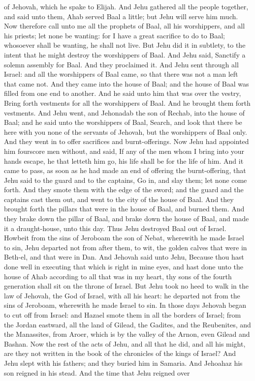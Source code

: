of Jehovah, which he spake to Elijah.  And Jehu gathered all the people together, and said unto them, Ahab served Baal a little; but Jehu will serve him much. Now therefore call unto me all the prophets of Baal, all his worshippers, and all his priests; let none be wanting: for I have a great sacrifice to do to Baal; whosoever shall be wanting, he shall not live. But Jehu did it in subtlety, to the intent that he might destroy the worshippers of Baal. And Jehu said, Sanctify a solemn assembly for Baal. And they proclaimed it. And Jehu sent through all Israel: and all the worshippers of Baal came, so that there was not a man left that came not. And they came into the house of Baal; and the house of Baal was filled from one end to another. And he said unto him that was over the vestry, Bring forth vestments for all the worshippers of Baal. And he brought them forth vestments. And Jehu went, and Jehonadab the son of Rechab, into the house of Baal; and he said unto the worshippers of Baal, Search, and look that there be here with you none of the servants of Jehovah, but the worshippers of Baal only. And they went in to offer sacrifices and burnt-offerings. Now Jehu had appointed him fourscore men without, and said, If any of the men whom I bring into your hands escape, he that letteth him go, his life shall be for the life of him.  And it came to pass, as soon as he had made an end of offering the burnt-offering, that Jehu said to the guard and to the captains, Go in, and slay them; let none come forth. And they smote them with the edge of the sword; and the guard and the captains cast them out, and went to the city of the house of Baal. And they brought forth the pillars that were in the house of Baal, and burned them. And they brake down the pillar of Baal, and brake down the house of Baal, and made it a draught-house, unto this day. Thus Jehu destroyed Baal out of Israel.  Howbeit from the sins of Jeroboam the son of Nebat, wherewith he made Israel to sin, Jehu departed not from after them, to wit, the golden calves that were in Beth-el, and that were in Dan. And Jehovah said unto Jehu, Because thou hast done well in executing that which is right in mine eyes, and hast done unto the house of Ahab according to all that was in my heart, thy sons of the fourth generation shall sit on the throne of Israel. But Jehu took no heed to walk in the law of Jehovah, the God of Israel, with all his heart: he departed not from the sins of Jeroboam, wherewith he made Israel to sin.  In those days Jehovah began to cut off from Israel: and Hazael smote them in all the borders of Israel; from the Jordan eastward, all the land of Gilead, the Gadites, and the Reubenites, and the Manassites, from Aroer, which is by the valley of the Arnon, even Gilead and Bashan. Now the rest of the acts of Jehu, and all that he did, and all his might, are they not written in the book of the chronicles of the kings of Israel? And Jehu slept with his fathers; and they buried him in Samaria. And Jehoahaz his son reigned in his stead. And the time that Jehu reigned over 